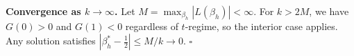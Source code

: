 \documentclass[mnsc,nonblindrev]{informs3_NoOR}
\begin{document}
\medskip\noindent\textbf{Convergence as $k \to \infty$.}
Let $M = \max_{\beta_h}|L(\beta_h)| < \infty$. For $k > 2M$, we have $G(0) > 0$ and $G(1) < 0$ regardless of $t$-regime, so the interior case applies. Any solution satisfies $|\beta_h^* - \frac{1}{2}| \leq M/k \to 0$. \hfill$\square$
 
 


\vfill
\pagebreak

 
 
\end{document}
